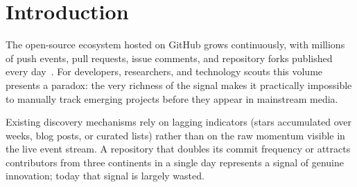 \documentclass[sigconf]{acmart}
\begin{document}



\maketitle

\section{Introduction}

The open-source ecosystem hosted on GitHub grows continuously, with millions
of push events, pull requests, issue comments, and repository forks published
every day~\cite{github-rest-api}. For developers, researchers, and technology
scouts this volume presents a paradox: the very richness of the signal makes
it practically impossible to manually track emerging projects before they
appear in mainstream media.

Existing discovery mechanisms rely on lagging indicators (stars accumulated
over weeks, blog posts, or curated lists) rather than on the raw momentum
visible in the live event stream. A repository that doubles its commit
frequency or attracts contributors from three continents in a single day
represents a signal of genuine innovation; today that signal is largely wasted.
\end{document}
